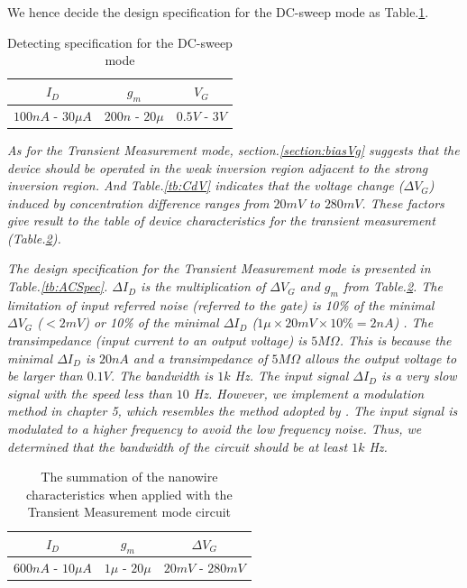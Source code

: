 We hence decide the design specification for the DC-sweep mode as Table.\ref{tb:DCspec}.
\begin{table}[!htbp]
    {\fontfamily{}\fontsize{10}{14}\selectfont
    \centering
    \begin{tabular}{c|c|c}
        $I_D$ & $g_m$ & $V_G$\\
        \hline
        $100n A$ - $30\mu A$ & $200n $ - $20\mu$ & $0.5V$ - $3V$\\
    \end{tabular}
    \caption{Detecting specification for the DC-sweep mode}
    \label{tb:DCspec}
    }
\end{table}


\emph{As for the Transient Measurement mode, section.\ref{section:biasVg} suggests that the device should be operated in the weak inversion region adjacent to the strong inversion region.
And Table.\ref{tb:CdV} indicates that the voltage change ($\Delta V_G$) induced by concentration difference ranges from $20mV$ to $280mV$.
These factors give result to the table of device characteristics for the transient measurement (Table.\ref{tb:ACinput}).}

\emph{The design specification for the Transient Measurement mode is presented in Table.\ref{tb:ACSpec}.
$\Delta I_D$ is the multiplication of $\Delta V_G$ and $g_m$ from Table.\ref{tb:ACinput}.
The limitation of input referred noise (referred to the gate) is 10\% of the minimal $\Delta V_G$ ($< 2mV$) or 10\% of the minimal $\Delta I_D$ ($1\mu \times 20mV \times 10\%= 2n A$) .
The transimpedance (input current to an output voltage) is $5M \Omega$.
This is because the minimal $\Delta I_D$  is $20n A$ and a transimpedance of $5M \Omega$ allows the output voltage to be larger than $0.1 V$.
The bandwidth is $1k$ Hz.
The input signal $\Delta I_D$ is a very slow signal with the speed less than $10$ Hz.
However, we implement a modulation method in chapter 5, which resembles the method adopted by \cite{JLockin}.
The input signal is modulated to a higher frequency to avoid the low frequency noise.
Thus, we determined that the bandwidth of the circuit should be at least $1k$ Hz.
}

\begin{table}[!htbp]
    {\fontfamily{}\fontsize{10}{14}\selectfont
    \centering
    \begin{tabular}{c|c|c}
        $I_D$ & $g_m$ & $\Delta V_G$ \\
        \hline
        $600n A$ - $10\mu A$ & $1\mu $ - $20\mu$ & $20mV$ - $280mV$\\
    \end{tabular}
    \caption{The summation of the nanowire characteristics when applied with the Transient Measurement mode circuit}
    \label{tb:ACinput}
    }
\end{table}

